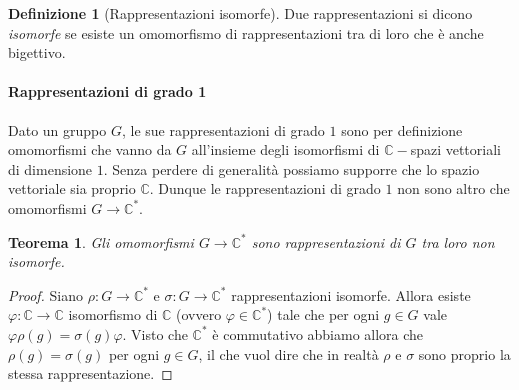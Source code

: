 \documentclass[11pt]{article}
\theoremstyle{plain}
\newtheorem{thm}{Teorema}[section]
\theoremstyle{definition}
\newtheorem{defn}{Definizione}[section]
\theoremstyle{remark}
\newcommand{\C}{\mathbb{C}}
\begin{document}
\begin{defn}[Rappresentazioni isomorfe]
Due rappresentazioni si dicono \textit{isomorfe} se esiste un omomorfismo di rappresentazioni tra di loro che è anche bigettivo.
\end{defn}




\paragraph{Rappresentazioni di grado 1}\label{par:rappr_deg_1}
Dato un gruppo $G$, le sue rappresentazioni di grado $1$ sono per definizione
omomorfismi che vanno da $G$ all'insieme degli isomorfismi di $\C-$spazi vettoriali di dimensione $1$.
Senza perdere di generalità possiamo supporre che lo spazio vettoriale sia proprio $\C$. Dunque le
rappresentazioni di grado $1$ non sono altro che omomorfismi $G\to\C^*$.
\begin{thm}
Gli omomorfismi $G\to\C^*$ sono rappresentazioni di $G$ tra loro non isomorfe.
\end{thm}
\begin{proof}
Siano $\rho:G\to\C^*$ e $\sigma:G\to\C^*$ rappresentazioni isomorfe. Allora
esiste $\varphi:\C\to\C$ isomorfismo di $\C$ (ovvero $\varphi\in\C^*$) tale che per ogni $g\in G$ vale $\varphi \rho(g) = \sigma(g) \varphi$.
Visto che $\C^*$ è commutativo abbiamo allora che $\rho(g) = \sigma(g)$ per ogni $g\in G$, il che vuol dire che
in realtà $\rho$ e $\sigma$ sono proprio la stessa rappresentazione.
\end{proof}
\end{document}
